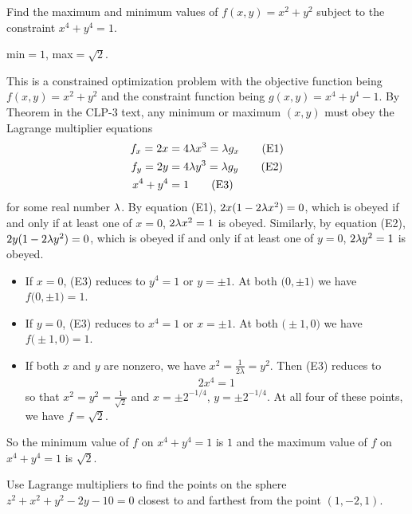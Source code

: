 \begin{question}[M200 2008A] %
Find the maximum and minimum values of $f(x,y) = x^2 + y^2$ 
subject to the constraint $x^4 + y^4 = 1$.
\end{question}

%

\begin{answer}
min$=1$, max$=\sqrt{2}$.
\end{answer}

\begin{solution}
This is a constrained optimization problem with the objective function being
$f(x,y) = x^2 + y^2$ and the constraint function being
$g(x,y) =x^4 + y^4 - 1$.
By Theorem  in the CLP-3 text, any minimum
or maximum $(x,y)$ must obey the  Lagrange multiplier equations
\begin{align*}
f_x = 2x &=4 \lambda x^3 = \lambda g_x \tag{E1} \\ 
f_y = 2y &=4 \lambda y^3 = \lambda g_y \tag{E2} \\ 
x^4 + y^4 &= 1 \tag{E3}
\end{align*}
for some real number $\lambda$. By equation (E1), $2x(1-2\lambda x^2)=0$, which is
obeyed if and only if at least one of $x=0$, $2\lambda x^2=1$ is obeyed.
Similarly, by equation (E2), $2y(1-2\lambda y^2)=0$, which is
obeyed if and only if at least one of $y=0$, $2\lambda y^2=1$ is obeyed.
\begin{itemize}
\item 
If $x=0$, (E3) reduces to $y^4=1$ or $y=\pm 1$. At both
$\big(0,\pm 1\big)$ we have $f\big(0,\pm1\big)=1$.
\item 
If $y=0$, (E3) reduces to $x^4=1$ or $x=\pm 1$. At both
$\big(\pm 1,0\big)$ we have $f\big(\pm1,0\big)=1$.
\item
If both $x$ and $y$ are nonzero, we have $x^2=\frac{1}{2\lambda}=y^2$.
Then (E3) reduces to
\begin{align*}
2x^4=1 
\end{align*}
so that
$x^2=y^2=\frac{1}{\sqrt{2}}$ and $x=\pm 2^{-1/4}$,
$y=\pm 2^{-1/4}$.  At all four of these points, we
have $f=\sqrt{2}$.

\end{itemize}
So the minimum value of $f$ on $x^4+y^4=1$ is $1$ and
the maximum value of $f$ on $x^4+y^4=1$ is $\sqrt{2}$.  
\end{solution}

\begin{question}[M200 2008D] %
Use Lagrange multipliers to find the points on the sphere
$z^2 + x^2 + y^2 - 2y - 10 = 0$ closest to and farthest from the point 
$(1, -2, 1)$.
\end{question}

